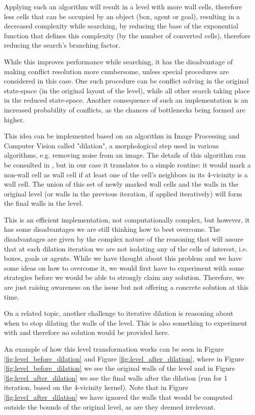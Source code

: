 \documentclass[letterpaper]{article}
\begin{document}
Applying such an algorithm will result in a level with more wall cells, therefore less cells that can be occupied by an object (box, agent or goal), resulting in a decreased complexity while searching, by reducing the base of the exponential function that defines this complexity (by the number of converted cells), therefore reducing the search's branching factor.

While this improves performance while searching, it has the disadvantage of making conflict resolution more cumbersome, unless special procedures are considered in this case. One such procedure can be conflict solving in the original state-space (in the original layout of the level), while all other search taking place in the reduced state-space. Another consequence of such an implementation is an increased probability of conflicts, as the chances of bottlenecks being formed are higher.

This idea can be implemented based on an algorithm in Image Processing and Computer Vision called "dilation", a morphological step used in various algorithms, e.g. removing noise from an image. The details of this algorithm can be consulted in \cite{dilation}, but in our case it translates to a simple routine: it would mark a non-wall cell as wall cell if at least one of the cell's neighbors in its 4-vicinity is a wall cell. The union of this set of newly marked wall cells and the walls in the original level (or walls in the previous iteration, if applied iteratively) will form the final walls in the level.

This is an efficient implementation, not computationally complex, but however, it has some disadvantages we are still thinking how to best overcome. The disadvantages are given by the complex nature of the reasoning that will assure that at each dilation iteration we are not isolating any of the cells of interest, i.e. boxes, goals or agents. While we have thought about this problem and we have some ideas on how to overcome it, we would first have to experiment with some strategies before we would be able to strongly claim any solution. Therefore, we are just raising awareness on the issue but not offering a concrete solution at this time.

On a related topic, another challenge to iterative dilation is reasoning about when to stop dilating the walls of the level. This is also something to experiment with and therefore no solution would be provided here.

An example of how this level transformation works can be seen in Figure \ref{fig:level_before_dilation} and Figure \ref{fig:level_after_dilation}, where in Figure \ref{fig:level_before_dilation} we see the original walls of the level and in Figure \ref{fig:level_after_dilation} we see the final walls after the dilation (run for 1 iteration, based on the 4-vicinity kernel). Note that in Figure \ref{fig:level_after_dilation} we have ignored the walls that would be computed outside the bounds of the original level, as are they deemed irrelevant.
\end{document}
